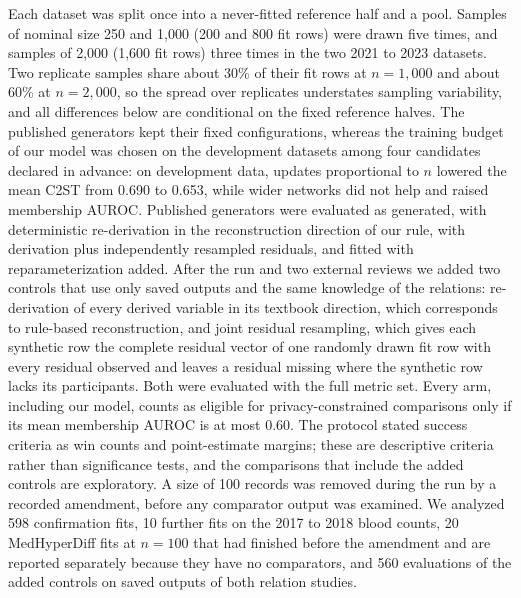 \documentclass[conference]{IEEEtran}
\begin{document}
Each dataset was split once into a never-fitted reference half and a pool. Samples of nominal size 250 and 1,000 (200 and 800 fit rows) were drawn five times, and samples of 2,000 (1,600 fit rows) three times in the two 2021 to 2023 datasets. Two replicate samples share about 30\% of their fit rows at $n = 1{,}000$ and about 60\% at $n = 2{,}000$, so the spread over replicates understates sampling variability, and all differences below are conditional on the fixed reference halves. The published generators kept their fixed configurations, whereas the training budget of our model was chosen on the development datasets among four candidates declared in advance: on development data, updates proportional to $n$ lowered the mean C2ST from 0.690 to 0.653, while wider networks did not help and raised membership AUROC. Published generators were evaluated as generated, with deterministic re-derivation in the reconstruction direction of our rule, with derivation plus independently resampled residuals, and fitted with reparameterization added. After the run and two external reviews we added two controls that use only saved outputs and the same knowledge of the relations: re-derivation of every derived variable in its textbook direction, which corresponds to rule-based reconstruction, and joint residual resampling, which gives each synthetic row the complete residual vector of one randomly drawn fit row with every residual observed and leaves a residual missing where the synthetic row lacks its participants. Both were evaluated with the full metric set. Every arm, including our model, counts as eligible for privacy-constrained comparisons only if its mean membership AUROC is at most 0.60. The protocol stated success criteria as win counts and point-estimate margins; these are descriptive criteria rather than significance tests, and the comparisons that include the added controls are exploratory. A size of 100 records was removed during the run by a recorded amendment, before any comparator output was examined. We analyzed 598 confirmation fits, 10 further fits on the 2017 to 2018 blood counts, 20 MedHyperDiff fits at $n = 100$ that had finished before the amendment and are reported separately because they have no comparators, and 560 evaluations of the added controls on saved outputs of both relation studies.
\end{document}
